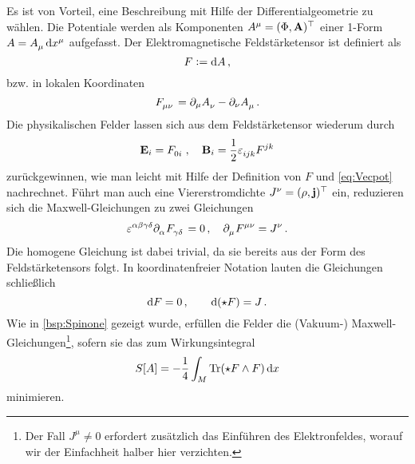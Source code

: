 Es ist von Vorteil, eine Beschreibung mit Hilfe der Differentialgeometrie
zu wählen.
Die Potentiale werden als Komponenten
$\tensor{A}{^\mu}=(\Phi,\vec{A})\transpose$ einer 1-Form
$A=\tensor{A}{_\mu}\dif\tensor{x}{^\mu}$ aufgefasst.
Der Elektromagnetische Feldstärketensor ist definiert als
\begin{equation}
F:=\dif
A\,,
\end{equation}
bzw. in lokalen Koordinaten
\begin{equation}
\tensor{F}{_\mu_\nu}=\partial_\mu\tensor{A}{_\nu}-\partial_\nu\tensor{A}{_\mu}\,.
\end{equation}
Die physikalischen Felder lassen sich aus dem Feldstärketensor wiederum durch
\begin{equation}
\vec{E}_{i}=\tensor{F}{_0_i}\,,\quad
\vec{B}_i=\frac{1}{2}\tensor{\varepsilon}{_i_j_k}\tensor{F}{^j^k}
\end{equation}
zurückgewinnen, wie man leicht mit Hilfe der Definition von $F$ und
\eqref{eq:Vecpot} nachrechnet. Führt man auch eine Viererstromdichte
$\tensor{J}{^\nu}=(\rho,\vec{j})\transpose$ ein,
reduzieren sich die Maxwell-Gleichungen zu zwei
Gleichungen
\begin{equation}
\tensor{\varepsilon}{^\alpha^\beta^\gamma^\delta}
\pdif{_{\alpha}}\tensor{F}{_\gamma_{\delta}}=0\,,\quad
\pdif{_\mu}\tensor{F}{^\mu^\nu}=\tensor{J}{^\nu}\,.
\end{equation}
Die homogene Gleichung ist dabei trivial, da sie bereits aus der Form des
Feldstärketensors folgt.
In koordinatenfreier Notation lauten die Gleichungen schließlich 
\begin{equation}
\dif F = 0\,,\quad\quad \dif\,(\star F)= J\,.
\end{equation}
Wie in \autoref{bsp:Spinone} gezeigt wurde, erfüllen die Felder die (Vakuum-)
Maxwell-Gleichungen\footnote{Der Fall $J^\mu\neq 0$ erfordert zusätzlich das
Einführen des Elektronfeldes, worauf wir der Einfachheit halber hier
verzichten.}, sofern sie das zum Wirkungsintegral
\begin{equation}
S[A]=-\frac{1}{4}\int_M\tr\left(\star F\wedge F\right)\dif x
\end{equation}
minimieren.
